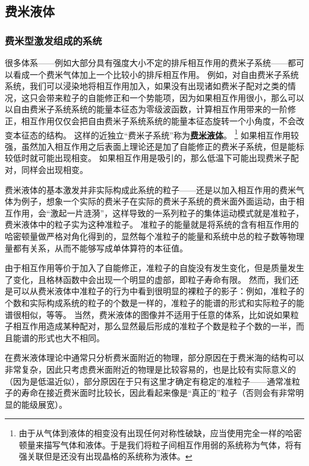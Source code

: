 \documentclass[hyperref, UTF8, a4paper]{ctexart}
\newcommand{\concept}[1]{\underline{\textbf{#1}}}
\begin{document}
\subsection{费米液体}

\subsubsection{费米型激发组成的系统}

很多体系——例如大部分具有强度大小不定的排斥相互作用的费米子系统——都可以看成一个费米气体加上一个比较小的排斥相互作用。
例如，对自由费米子系统系统，我们可以浸染地将相互作用加入，如果没有出现诸如费米子配对之类的情况，这只会带来粒子的自能修正和一个势能项，因为如果相互作用很小，那么可以以自由费米子系统系统的能量本征态为零级波函数，计算相互作用带来的一阶修正，相互作用仅仅会把自由费米子系统系统的能量本征态旋转一个小角度，不会改变本征态的结构。
这样的近独立“费米子系统”称为\concept{费米液体}。%
\footnote{由于从气体到液体的相变没有出现任何对称性破缺，应当使用完全一样的哈密顿量来描写气体和液体。于是我们将粒子间相互作用弱的系统称为气体，将有强关联但是还没有出现晶格的系统称为液体。}%
如果相互作用较强，虽然加入相互作用之后表面上理论还是加了自能修正的费米子系统，但是能标较低时就可能出现相变。
如果相互作用是吸引的，那么低温下可能出现费米子配对，同样会出现相变。

费米液体的基本激发并非实际构成此系统的粒子——还是以加入相互作用的费米气体为例子，想象一个实际的费米子在实际的费米子系统的费米面外面运动，由于相互作用，会“激起一片涟漪”，这样导致的一系列粒子的集体运动模式就是准粒子，费米液体中的粒子实为这种准粒子。
准粒子的能量就是将系统的含有相互作用的哈密顿量做严格对角化得到的，显然每个准粒子的能量和系统中总的粒子数等物理量都有关系，从而不能够写成单体算符的本征值。

由于相互作用等价于加入了自能修正，准粒子的自旋没有发生变化，但是质量发生了变化，且格林函数中会出现一个明显的虚部，即粒子寿命有限。
然而，我们还是可以从费米液体中准粒子的行为中看到很明显的裸粒子的影子：例如，准粒子的个数和实际构成系统的粒子的个数是一样的，准粒子的能谱的形式和实际粒子的能谱很相似，等等。
当然，费米液体的图像并不适用于任意的体系，比如说如果粒子相互作用造成某种配对，那么显然最后形成的准粒子个数是粒子个数的一半，而且能谱的形式也大不相同。

在费米液体理论中通常只分析费米面附近的物理，部分原因在于费米海的结构可以非常复杂，因此只考虑费米面附近的物理是比较容易的，也是比较有实际意义的（因为是低温近似），部分原因在于只有这里才确定有稳定的准粒子——通常准粒子的寿命在接近费米面时比较长，因此看起来像是“真正的”粒子（否则会有非常明显的能级展宽）。
\end{document}
